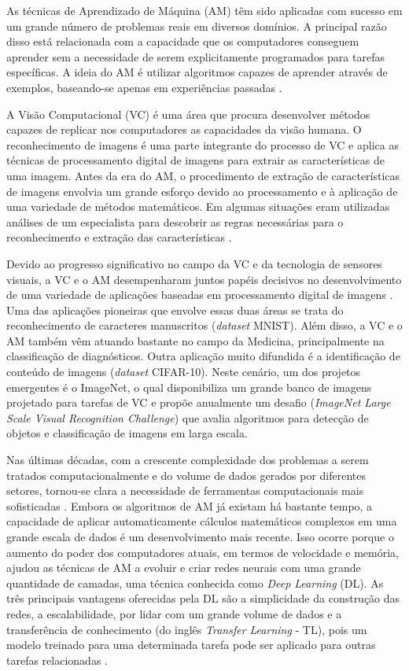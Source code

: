 As técnicas de Aprendizado de Máquina (AM) têm sido aplicadas com sucesso em um grande número de problemas reais em diversos domínios. A principal razão disso está relacionada com a capacidade que os computadores conseguem aprender sem a necessidade de serem explicitamente programados para tarefas específicas. A ideia do AM é utilizar algoritmos capazes de aprender através de exemplos, baseando-se apenas em experiências passadas \cite{ref:faceli,ref:gulli}.

A Visão Computacional (VC) é uma área que procura desenvolver métodos capazes de replicar nos computadores as capacidades da visão humana. O reconhecimento de imagens é uma parte integrante do processo de VC e aplica as técnicas de processamento digital de imagens para extrair as características de uma imagem. Antes da era do AM, o procedimento de extração de características de imagens envolvia um grande esforço devido ao processamento e à aplicação de uma variedade de métodos matemáticos. Em algumas situações eram utilizadas análises de um especialista para descobrir as regras necessárias para o reconhecimento e extração das características \cite{ref:faceli}.  
 

Devido ao progresso significativo no campo da VC e da tecnologia de sensores visuais, a VC e o AM desempenharam juntos papéis decisivos no desenvolvimento de uma variedade de aplicações baseadas em processamento digital de imagens \cite{ref:khan}. Uma das aplicações pioneiras que envolve essas duas áreas se trata do reconhecimento de caracteres manuscritos (\textit{dataset} MNIST). Além disso, a VC e o AM também vêm atuando bastante no campo da Medicina, principalmente na classificação de diagnósticos.  Outra aplicação muito difundida é a identificação de conteúdo de imagens (\textit{dataset} CIFAR-10). Neste cenário, um dos projetos emergentes é o ImageNet, o qual disponibiliza um grande banco de imagens projetado para tarefas de VC e propõe anualmente um desafio (\textit{ImageNet Large Scale Visual Recognition Challenge}) que avalia algoritmos para detecção de objetos e classificação de imagens em larga escala.

Nas últimas décadas, com a crescente complexidade dos problemas a serem tratados computacionalmente e do volume de dados gerados por diferentes setores, tornou-se clara a necessidade de ferramentas computacionais mais sofisticadas \cite{ref:faceli}. Embora os algoritmos de AM já existam há bastante tempo, a capacidade de aplicar automaticamente cálculos matemáticos complexos em uma grande escala de dados é um desenvolvimento mais recente. Isso ocorre porque o aumento do poder dos computadores atuais, em termos de velocidade e memória, ajudou as técnicas de AM a evoluir e criar redes neurais com uma grande quantidade de camadas, uma técnica conhecida como \textit{Deep Learning} (DL). As três principais vantagens oferecidas pela DL são a simplicidade da construção das redes, a escalabilidade, por lidar com um grande volume de dados e a transferência de conhecimento (do inglês \textit{Transfer Learning} - TL), pois um modelo treinado para uma determinada tarefa pode ser aplicado para outras tarefas relacionadas \cite{ref:khan}. 

